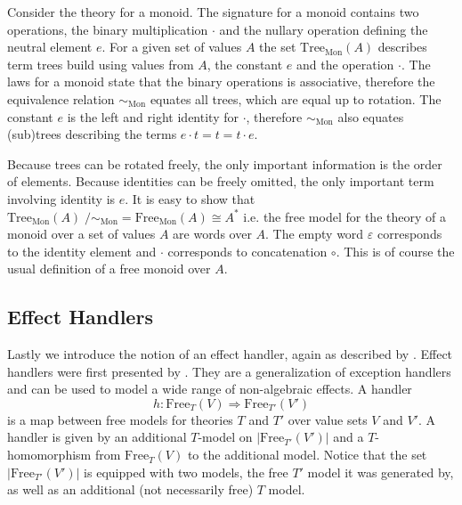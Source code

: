 Consider the theory for a monoid.
The signature for a monoid contains two operations, the binary multiplication $\cdot$
and the nullary operation defining the neutral element $e$.
For a given set of values $A$ the set $\mathrm{Tree}_{\mathrm{Mon}}(A)$ describes term trees
build using values from $A$, the constant $e$ and the operation $\cdot$.
The laws for a monoid state that the binary operations is associative, therefore
the equivalence relation $\sim_{\mathrm{Mon}}$ equates all trees, which are
equal up to rotation.
The constant $e$ is the left and right identity for $\cdot$, therefore
$\sim_{\mathrm{Mon}}$ also equates (sub)trees describing the terms $e\cdot t = t
= t \cdot e$.

Because trees can be rotated freely, the only important information is the order
of elements.
Because identities can be freely omitted, the only important term involving
identity is $e$.
It is easy to show that $\mathrm{Tree}_{\mathrm{Mon}}(A)
\;/\sim_{\mathrm{Mon}} = \mathrm{Free}_{\mathrm{Mon}}(A) \cong A^*$ i.e. the
free model for the theory of a monoid over a set of values $A$ are words over
$A$.
The empty word $\varepsilon$ corresponds to the identity element and $\cdot$
corresponds to concatenation $\circ$.
This is of course the usual definition of a free monoid over $A$.


\subsection{Effect Handlers}
\label{preliminaries:handler}

Lastly we introduce the notion of an effect handler, again as described by
\textcite{DBLP:journals/corr/abs-1807-05923}.
Effect handlers  were first presented by \textcite{DBLP:conf/esop/PlotkinP09}.
They are a generalization of exception handlers and can be used to model a wide
range of non-algebraic effects.
A handler
\[
  h : \mathrm{Free}_{T}(V) \Rightarrow \mathrm{Free}_{T'}(V')
\]
is a map between free models for theories $T$ and $T'$ over value sets $V$ and
$V'$.
A handler is given by an additional $T$-model on $|\mathrm{Free}_{T'}(V')|$ and
a $T$-homomorphism from $\mathrm{Free}_{T}(V)$ to the additional model.
Notice that the set $|\mathrm{Free}_{T'}(V')|$ is equipped with two models, the
free $T'$ model it was generated by, as well as an additional (not necessarily
free) $T$ model.

